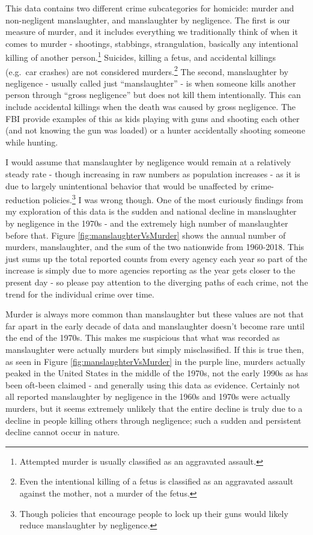 \documentclass[
  12pt,
  openany]{book}
\begin{document}
This data contains two different crime subcategories for homicide: murder and non-negligent manslaughter, and manslaughter by negligence. The first is our measure of murder, and it includes everything we traditionally think of when it comes to murder - shootings, stabbings, strangulation, basically any intentional killing of another person.\footnote{Attempted murder is usually classified as an aggravated assault.} Suicides, killing a fetus, and accidental killings (e.g.~car crashes) are not considered murders.\footnote{Even the intentional killing of a fetus is classified as an aggravated assault against the mother, not a murder of the fetus.} The second, manslaughter by negligence - usually called just ``manslaughter'' - is when someone kills another person through ``gross negligence'' but does not kill them intentionally. This can include accidental killings when the death was caused by gross negligence. The FBI provide examples of this as kids playing with guns and shooting each other (and not knowing the gun was loaded) or a hunter accidentally shooting someone while hunting.

I would assume that manslaughter by negligence would remain at a relatively steady rate - though increasing in raw numbers as population increases - as it is due to largely unintentional behavior that would be unaffected by crime-reduction policies.\footnote{Though policies that encourage people to lock up their guns would likely reduce manslaughter by negligence.} I was wrong though. One of the most curiously findings from my exploration of this data is the sudden and national decline in manslaughter by negligence in the 1970s - and the extremely high number of manslaughter before that. Figure \ref{fig:manslaughterVsMurder} shows the annual number of murders, manslaughter, and the sum of the two nationwide from 1960-2018. This just sums up the total reported counts from every agency each year so part of the increase is simply due to more agencies reporting as the year gets closer to the present day - so please pay attention to the diverging paths of each crime, not the trend for the individual crime over time.

Murder is always more common than manslaughter but these values are not that far apart in the early decade of data and manslaughter doesn't become rare until the end of the 1970s. This makes me suspicious that what was recorded as manslaughter were actually murders but simply misclassified. If this is true then, as seen in Figure \ref{fig:manslaughterVsMurder} in the purple line, murders actually peaked in the United States in the middle of the 1970s, not the early 1990s as has been oft-been claimed - and generally using this data as evidence. Certainly not all reported manslaughter by negligence in the 1960s and 1970s were actually murders, but it seems extremely unlikely that the entire decline is truly due to a decline in people killing others through negligence; such a sudden and persistent decline cannot occur in nature.
\end{document}
